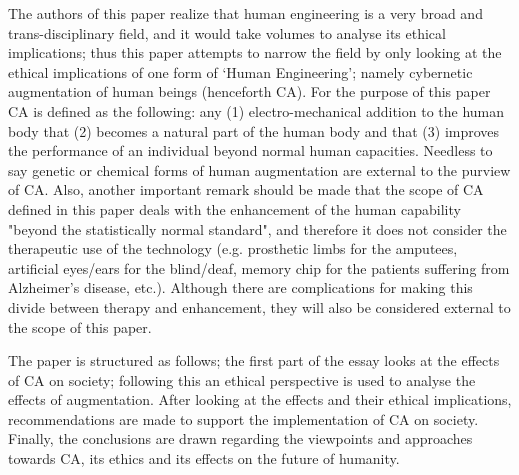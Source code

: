 The authors of this paper realize that human engineering is a very broad and trans-disciplinary field, and it would take volumes to analyse its ethical implications; thus this paper attempts to narrow the field by only looking at the ethical implications of one form of ‘Human Engineering’; namely cybernetic augmentation of human beings (henceforth CA). For the purpose of this paper CA is defined as the following: any (1) electro-mechanical addition to the human body that (2) becomes a natural part of the human body and that (3) improves the performance of an individual beyond normal human capacities. Needless to say genetic or chemical forms of human augmentation are external to the purview of CA. Also, another important remark should be made that the scope of CA defined in this paper deals with the enhancement of the human capability "beyond the statistically normal standard", and therefore it does not consider the therapeutic use of the technology (e.g. prosthetic limbs for the amputees, artificial eyes/ears for the blind/deaf, memory chip for the patients suffering from Alzheimer's disease, etc.). Although there are complications for making this divide between therapy and enhancement, they will also be considered external to the scope of this paper.

The paper is structured as follows; the first part of the essay looks at the effects of CA on society; following this an ethical perspective is used to analyse the effects of augmentation. After looking at the effects and their ethical implications, recommendations are made to support the implementation of CA on society. Finally, the conclusions are drawn regarding the viewpoints and approaches towards CA, its ethics and its effects on the future of humanity.